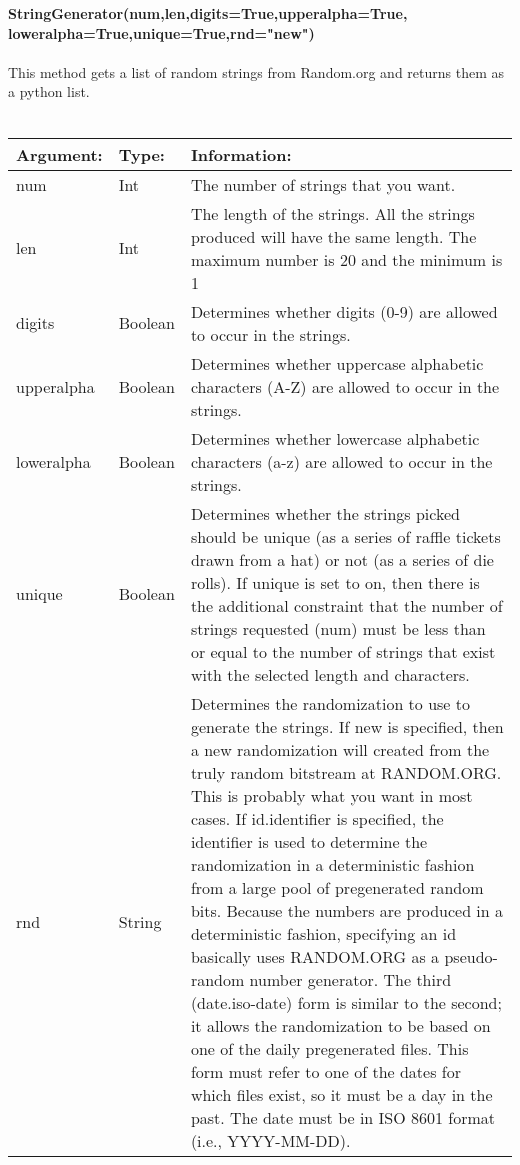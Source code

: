 \documentclass[12 pt]{report}
\begin{document}
\textbf{StringGenerator(num,len,digits=True,upperalpha=True,}\\
\textbf{loweralpha=True,unique=True,rnd="new")}\\\\
This method gets a list of random strings from Random.org and returns them as a python list.\\\\
   \begin{tabular}{ | l | l | p{10cm} | }
    \hline
    \textbf{Argument:} & \textbf{Type:} & \textbf{Information:} \\ \hline
    num & Int & The number of strings that you want.\\ \hline
    len & Int &The length of the strings. All the strings produced will have the same length. The maximum number is 20 and the minimum is 1 \\ \hline
    digits & Boolean & Determines whether digits (0-9) are allowed to occur in the strings. \\ \hline
    upperalpha & Boolean & Determines whether uppercase alphabetic characters (A-Z) are allowed to occur in the strings. \\ \hline
    loweralpha & Boolean & Determines whether lowercase alphabetic characters (a-z) are allowed to occur in the strings. \\ \hline
    unique & Boolean &  Determines whether the strings picked should be unique (as a series of raffle tickets drawn from a hat) or not (as a series of die rolls). If unique is set to on, then there is the additional constraint that the number of strings requested (num) must be less than or equal to the number of strings that exist with the selected length and characters. \\ \hline
    rnd & String & Determines the randomization to use to generate the strings. If new is specified, then a new randomization will created from the truly random bitstream at RANDOM.ORG. This is probably what you want in most cases. If id.identifier is specified, the identifier is used to determine the randomization in a deterministic fashion from a large pool of pregenerated random bits. Because the numbers are produced in a deterministic fashion, specifying an id basically uses RANDOM.ORG as a pseudo-random number generator. The third (date.iso-date) form is similar to the second; it allows the randomization to be based on one of the daily pregenerated files. This form must refer to one of the dates for which files exist, so it must be a day in the past. The date must be in ISO 8601  format (i.e., YYYY-MM-DD). \\
    \hline
  \end{tabular}
\end{document}
